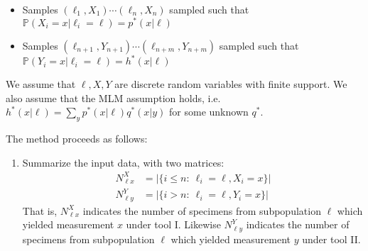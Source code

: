 \begin{itemize}
    \item Samples $(\ell_1,X_1)\cdots (\ell_n,X_n)$ sampled such that $\mathbb{P}(X_i=x|\ell_i=\ell)= p^*(x|\ell)$
    \item Samples $(\ell_{n+1},Y_{n+1})\cdots (\ell_{n+m},Y_{n+m})$ sampled such that $\mathbb{P}(Y_i=x|\ell_i=\ell)= h^*(x|\ell)$
\end{itemize}

We assume that $\ell,X,Y$ are discrete random variables with finite support. We also assume that the MLM assumption holds, i.e.\ $h^*(x|\ell)=\sum_y p^*(x|\ell)q^*(x|y)$ for some unknown $q^*$.

The method proceeds as follows:

\begin{enumerate}
\item Summarize the input data, with two matrices:
%
\begin{align*}
N^X_{\ell x} &= |\{i\leq n:\ \ell_i=\ell,X_i=x\}|\\
N^Y_{\ell y} &= |\{i>n:\ \ell_i=\ell,Y_i=x\}|
\end{align*}
%
That is, $N^X_{\ell x}$ indicates the number of specimens from subpopulation $\ell$ which yielded measurement $x$ under tool I.  Likewise $N^Y_{\ell y}$ indicates the number of specimens from subpopulation $\ell$ which yielded measurement $y$ under tool II. 


\end{enumerate}
